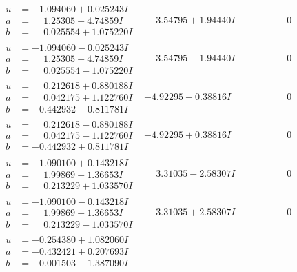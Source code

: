 \documentclass[1p]{elsarticle_modified}
\theoremstyle{definition}
\begin{document}
$$\begin{array}{c|c|c}
\begin{aligned}
u &= -1.094060 + 0.025243 I \\
a &= \phantom{-}1.25305 - 4.74859 I \\
b &= \phantom{-}0.025554 + 1.075220 I\end{aligned}
 & \phantom{-}3.54795 + 1.94440 I & \phantom{-0.000000 } 0 \\ \hline\begin{aligned}
u &= -1.094060 - 0.025243 I \\
a &= \phantom{-}1.25305 + 4.74859 I \\
b &= \phantom{-}0.025554 - 1.075220 I\end{aligned}
 & \phantom{-}3.54795 - 1.94440 I & \phantom{-0.000000 } 0 \\ \hline\begin{aligned}
u &= \phantom{-}0.212618 + 0.880188 I \\
a &= \phantom{-}0.042175 + 1.122760 I \\
b &= -0.442932 - 0.811781 I\end{aligned}
 & -4.92295 - 0.38816 I & \phantom{-0.000000 } 0 \\ \hline\begin{aligned}
u &= \phantom{-}0.212618 - 0.880188 I \\
a &= \phantom{-}0.042175 - 1.122760 I \\
b &= -0.442932 + 0.811781 I\end{aligned}
 & -4.92295 + 0.38816 I & \phantom{-0.000000 } 0 \\ \hline\begin{aligned}
u &= -1.090100 + 0.143218 I \\
a &= \phantom{-}1.99869 - 1.36653 I \\
b &= \phantom{-}0.213229 + 1.033570 I\end{aligned}
 & \phantom{-}3.31035 - 2.58307 I & \phantom{-0.000000 } 0 \\ \hline\begin{aligned}
u &= -1.090100 - 0.143218 I \\
a &= \phantom{-}1.99869 + 1.36653 I \\
b &= \phantom{-}0.213229 - 1.033570 I\end{aligned}
 & \phantom{-}3.31035 + 2.58307 I & \phantom{-0.000000 } 0 \\ \hline\begin{aligned}
u &= -0.254380 + 1.082060 I \\
a &= -0.432421 + 0.207693 I \\
b &= -0.001503 - 1.387090 I\end{aligned}

\end{array}$$
\end{document}
